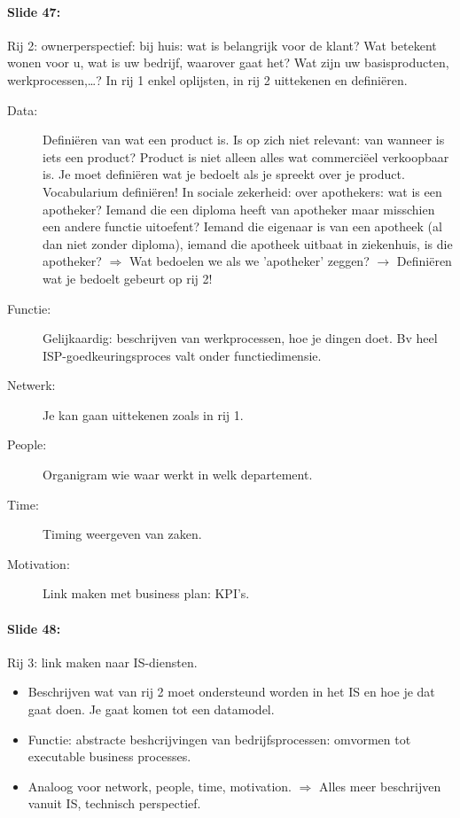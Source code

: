\documentclass[10pt,a4paper]{report}
\begin{document}
\paragraph{Slide 47:}Rij 2: ownerperspectief: bij huis: wat is belangrijk voor de klant? Wat betekent wonen voor u, wat is uw bedrijf, waarover gaat het? Wat zijn uw basisproducten, werkprocessen,…? In rij 1 enkel oplijsten, in rij 2 uittekenen en definiëren.
\begin{description}
\item[Data:] Definiëren van wat een product is. Is op zich niet relevant: van wanneer is iets een product? Product is niet alleen alles wat commerciëel verkoopbaar is. Je moet definiëren wat je bedoelt als je spreekt over je product. Vocabularium definiëren! In sociale zekerheid: over apothekers: wat is een apotheker? Iemand die een diploma heeft van apotheker maar misschien een andere functie uitoefent? Iemand die eigenaar is van een apotheek (al dan niet zonder diploma), iemand die apotheek uitbaat in ziekenhuis, is die apotheker? $\Rightarrow$ Wat bedoelen we als we 'apotheker' zeggen? $\rightarrow$ Definiëren wat je bedoelt gebeurt op rij 2! 
\item[Functie:] Gelijkaardig: beschrijven van werkprocessen, hoe je dingen doet. Bv heel ISP-goedkeuringsproces valt onder functiedimensie.
\item[Netwerk:] Je kan gaan uittekenen zoals in rij 1.
\item[People:] Organigram wie waar werkt in welk departement.
\item[Time:] Timing weergeven van zaken.
\item[Motivation:] Link maken met business plan: KPI's.
\end{description}

\paragraph{Slide 48:}Rij 3: link maken naar IS-diensten. 
\begin{itemize}
\item Beschrijven wat van rij 2 moet ondersteund worden in het IS en hoe je dat gaat doen. Je gaat komen tot een datamodel.
\item Functie: abstracte beshcrijvingen van bedrijfsprocessen: omvormen tot executable business processes.
\item Analoog voor network, people, time, motivation. $\Rightarrow$ Alles meer beschrijven vanuit IS, technisch perspectief.
\end{itemize}
\end{document}
